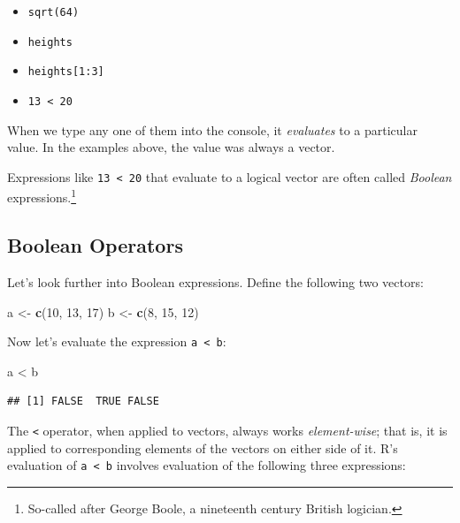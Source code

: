 \documentclass[]{book}
\makeatletter
\newenvironment{Shaded}{\begin{snugshade}}{\end{snugshade}}
\newcommand{\KeywordTok}[1]{\textcolor[rgb]{0.13,0.29,0.53}{\textbf{{#1}}}}
\newcommand{\DecValTok}[1]{\textcolor[rgb]{0.00,0.00,0.81}{{#1}}}
\newcommand{\StringTok}[1]{\textcolor[rgb]{0.31,0.60,0.02}{{#1}}}
\newcommand{\NormalTok}[1]{{#1}}
\providecommand{\tightlist}{%
  \setlength{\itemsep}{0pt}\setlength{\parskip}{0pt}}
\let\rmarkdownfootnote\footnote%
\def\footnote{\protect\rmarkdownfootnote}
\newenvironment{kframe}{%
\medskip{}
\setlength{\fboxsep}{.8em}
 \def\at@end@of@kframe{}%
 \ifinner\ifhmode%
  \def\at@end@of@kframe{\end{minipage}}%
  \begin{minipage}{\columnwidth}%
 \fi\fi%
 \def\FrameCommand##1{\hskip\@totalleftmargin \hskip-\fboxsep
 \colorbox{shadecolor}{##1}\hskip-\fboxsep
     \hskip-\linewidth \hskip-\@totalleftmargin \hskip\columnwidth}%
 \MakeFramed {\advance\hsize-\width
   \@totalleftmargin\z@ \linewidth\hsize
   \@setminipage}}%
 {\par\unskip\endMakeFramed%
 \at@end@of@kframe}
\renewenvironment{Shaded}{\begin{kframe}}{\end{kframe}}
\theoremstyle{definition}
\theoremstyle{definition}
\theoremstyle{remark}
\makeatother
\begin{document}
\begin{itemize}
\tightlist
\item
  \texttt{sqrt(64)}
\item
  \texttt{heights}
\item
  \texttt{heights{[}1:3{]}}
\item
  \texttt{13\ \textless{}\ 20}
\end{itemize}

When we type any one of them into the console, it \emph{evaluates} to a
particular value. In the examples above, the value was always a vector.

Expressions like \texttt{13\ \textless{}\ 20} that evaluate to a logical
vector are often called \emph{Boolean} expressions.\footnote{So-called
  after George Boole, a nineteenth century British logician.}

\subsection{Boolean Operators}\label{boolean-operators}

Let's look further into Boolean expressions. Define the following two
vectors:

\begin{Shaded}
\begin{Highlighting}[]
\NormalTok{a <-}\StringTok{ }\KeywordTok{c}\NormalTok{(}\DecValTok{10}\NormalTok{, }\DecValTok{13}\NormalTok{, }\DecValTok{17}\NormalTok{)}
\NormalTok{b <-}\StringTok{ }\KeywordTok{c}\NormalTok{(}\DecValTok{8}\NormalTok{, }\DecValTok{15}\NormalTok{, }\DecValTok{12}\NormalTok{)}
\end{Highlighting}
\end{Shaded}

Now let's evaluate the expression \texttt{a\ \textless{}\ b}:

\begin{Shaded}
\begin{Highlighting}[]
\NormalTok{a <}\StringTok{ }\NormalTok{b}
\end{Highlighting}
\end{Shaded}

\begin{verbatim}
## [1] FALSE  TRUE FALSE
\end{verbatim}

The \texttt{\textless{}} operator, when applied to vectors, always works
\emph{element-wise}; that is, it is applied to corresponding elements of
the vectors on either side of it. R's evaluation of
\texttt{a\ \textless{}\ b} involves evaluation of the following three
expressions:
\end{document}
